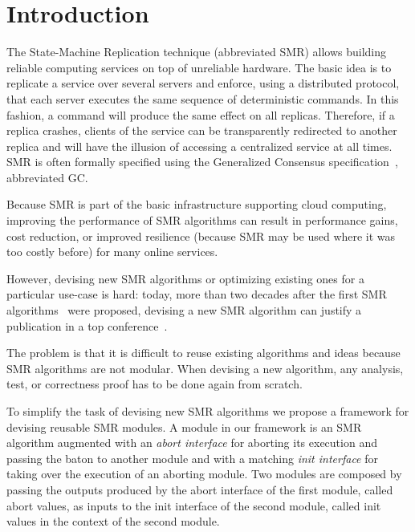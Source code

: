 \section{Introduction}

The State-Machine Replication technique (abbreviated SMR) allows building
reliable computing services on top of unreliable hardware. The basic idea is
to replicate a service over several servers and enforce, using a distributed
protocol, that each server executes the same sequence of deterministic commands.
In this fashion, a command will produce the same effect on all replicas.
Therefore, if a replica crashes, clients of the service can be transparently redirected to
another replica and will have the illusion of accessing a centralized service at
all times. SMR is often formally specified using the Generalized Consensus
specification~\cite{Lamport05GeneralizeConsensus}, abbreviated GC\@.

Because SMR is part of the basic infrastructure supporting cloud computing,
improving the performance of SMR algorithms can result in performance gains,
cost reduction, or improved resilience (because SMR may be used where it was
too costly before) for many online services.

However, devising new SMR algorithms or optimizing existing ones for a
particular use-case is hard: today, more than two decades after the first SMR
algorithms~\cite{Lamport98ParttimeParliament,BirmanJoseph87ReliableCommunicationPresenceFailures,OkiLiskov88ViewstampedReplicationGeneralPrimaryCopy,DworkLynchStockmeyer84ConsensusPresencePartialSynchronyPreliminaryVersion}
were proposed, devising a new SMR algorithm can justify a publication in a top
conference~\cite{MoraruAndersenKaminsky13ThereIsMoreConsensusEgalitarianParliaments,OngaroOusterhout14SearchUnderstandableConsensusAlgorithm}.

The problem is that it is difficult to reuse existing algorithms and ideas
because SMR algorithms are not modular. When devising a new algorithm, any
analysis, test, or correctness proof has to be done again from scratch.

To simplify the task of devising new SMR algorithms we propose a framework for
devising reusable SMR modules. A module in our framework is an SMR algorithm
augmented with an \emph{abort interface} for aborting its execution and passing
the baton to another module and with a matching \emph{init interface} for taking
over the execution of an aborting module. Two modules are composed by passing
the outputs produced by the abort interface of the first module, called abort
values, as inputs to the init interface of the second module, called init values
in the context of the second module.

